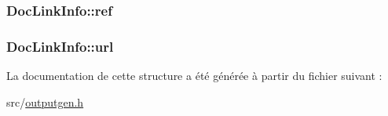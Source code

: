 \subsubsection[{ref}]{ Doc\+Link\+Info\+::ref}\label{struct_doc_link_info_abe4bbcd9b1709f58b0b29a9020c42e42}
\hypertarget{struct_doc_link_info_a7607f6298e3e16dd3ef26d2f823bbb9c}{}
\subsubsection[{url}]{ Doc\+Link\+Info\+::url}\label{struct_doc_link_info_a7607f6298e3e16dd3ef26d2f823bbb9c}


La documentation de cette structure a été générée à partir du fichier suivant \+:\begin{DoxyCompactItemize}
\item 
src/\hyperlink{outputgen_8h}{outputgen.\+h}\end{DoxyCompactItemize}
